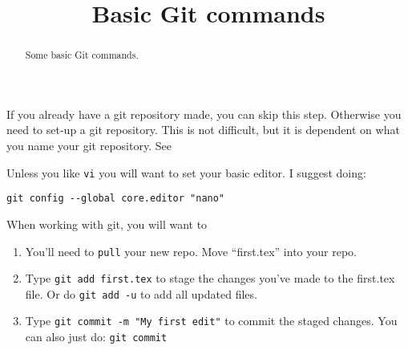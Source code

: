 \documentclass{ximera}
\title{Basic Git commands}
\begin{document}
\begin{abstract}
  Some basic Git commands.
\end{abstract}
\maketitle

If you already have a git repository made, you can skip this
step. Otherwise you need to set-up a git repository. This is not
difficult, but it is dependent on what you name your git
repository. See

Unless you like \verb|vi| you will want to set your basic editor. I suggest doing:

\begin{verbatim}
git config --global core.editor "nano"
\end{verbatim}

When working with git, you will want to
  \begin{enumerate}
\item You'll need to \verb!pull! your new repo. Move ``first.tex'' into your repo. 
\item Type \verb!git add first.tex! to stage the changes you've made
  to the first.tex file. Or do \verb|git add -u| to add all updated
  files.
\item Type \verb!git commit -m "My first edit"! to commit the staged changes. You can also just do: \verb|git commit|
  \end{enumerate}
\end{document}
